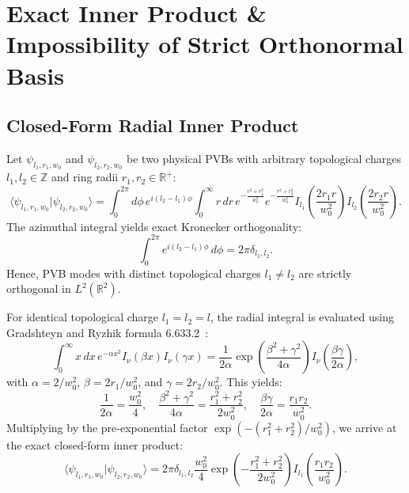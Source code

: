 \documentclass[11pt,a4paper]{article}
\begin{document}
\section{Exact Inner Product \& Impossibility of Strict Orthonormal Basis}
\label{sec:inner_product}

\subsection{Closed-Form Radial Inner Product}

Let $\psi_{l_1, r_1, w_0}$ and $\psi_{l_2, r_2, w_0}$ be two physical PVBs with arbitrary topological charges $l_1, l_2 \in \mathbb{Z}$ and ring radii $r_1, r_2 \in \mathbb{R}^+$:
\begin{equation}
\langle \psi_{l_1, r_1, w_0} | \psi_{l_2, r_2, w_0} \rangle = \int_0^{2\pi} d\phi \, e^{i(l_2 - l_1)\phi} \int_0^\infty r \, dr \, e^{-\frac{r^2 + r_1^2}{w_0^2}} e^{-\frac{r^2 + r_2^2}{w_0^2}} I_{l_1}\left( \frac{2 r_1 r}{w_0^2} \right) I_{l_2}\left( \frac{2 r_2 r}{w_0^2} \right).
\end{equation}
The azimuthal integral yields exact Kronecker orthogonality:
\begin{equation}
\int_0^{2\pi} e^{i(l_2 - l_1)\phi} \, d\phi = 2\pi \delta_{l_1, l_2}.
\end{equation}
Hence, PVB modes with distinct topological charges $l_1 \neq l_2$ are strictly orthogonal in $L^2(\mathbb{R}^2)$.

For identical topological charge $l_1 = l_2 = l$, the radial integral is evaluated using Gradshteyn and Ryzhik formula 6.633.2~\cite{Gradshteyn2014}:
\begin{equation}
\int_0^\infty x \, dx \, e^{-\alpha x^2} I_\nu(\beta x) I_\nu(\gamma x) = \frac{1}{2\alpha} \exp\left( \frac{\beta^2 + \gamma^2}{4\alpha} \right) I_\nu\left( \frac{\beta \gamma}{2\alpha} \right),
\end{equation}
with $\alpha = 2 / w_0^2$, $\beta = 2 r_1 / w_0^2$, and $\gamma = 2 r_2 / w_0^2$. This yields:
\begin{equation}
\frac{1}{2\alpha} = \frac{w_0^2}{4}, \quad \frac{\beta^2 + \gamma^2}{4\alpha} = \frac{r_1^2 + r_2^2}{2 w_0^2}, \quad \frac{\beta \gamma}{2\alpha} = \frac{r_1 r_2}{w_0^2}.
\end{equation}
Multiplying by the pre-exponential factor $\exp(-(r_1^2 + r_2^2)/w_0^2)$, we arrive at the exact closed-form inner product:
\begin{equation}
\boxed{\langle \psi_{l_1, r_1, w_0} | \psi_{l_2, r_2, w_0} \rangle = 2\pi \delta_{l_1, l_2} \frac{w_0^2}{4} \exp\left( - \frac{r_1^2 + r_2^2}{2 w_0^2} \right) I_{l_1}\left( \frac{r_1 r_2}{w_0^2} \right).}
\label{eq:exact_inner_product}
\end{equation}
\end{document}
